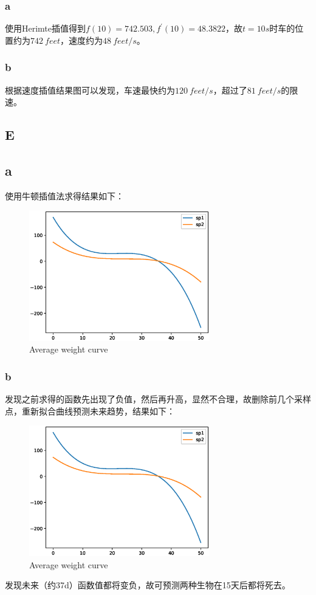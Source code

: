 \documentclass[12]{article}%
\begin{document}
            \subsubsection{a}
                使用Herimte插值得到$f(10)=742.503,f^{'}(10)=48.3822$，故$t=10s$时车的位置约为$742\ feet$，速度约为$48\ feet/s$。
            \subsubsection{b}
                根据速度插值结果图可以发现，车速最快约为$120\ feet/s$，超过了$81\ feet/s$的限速。
        
        \subsection{E}
            \subsection{a}
                使用牛顿插值法求得结果如下：
                \begin{figure}[H]
                    \centering
                    \includegraphics[width=0.7\textwidth]{./pic/E_2.eps}
                    \caption{Average weight curve}
                \end{figure}
            \subsubsection{b}
                发现之前求得的函数先出现了负值，然后再升高，显然不合理，故删除前几个采样点，重新拟合曲线预测未来趋势，结果如下：
                
                \begin{figure}[H]
                    \centering
                    \includegraphics[width=0.7\textwidth]{./pic/E_2.eps}
                    \caption{Average weight curve}
                \end{figure}
                
                发现未来（约37d）函数值都将变负，故可预测两种生物在15天后都将死去。
\end{document}
